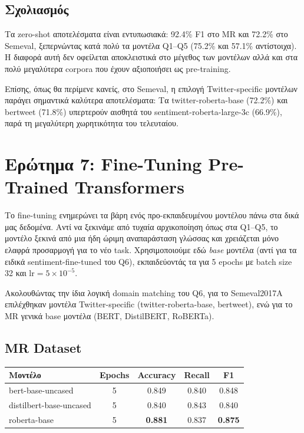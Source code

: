\documentclass[12pt]{article}
\begin{document}
\subsection{Σχολιασμός}

Τα zero-shot αποτελέσματα είναι εντυπωσιακά: 92.4\% F1 στο MR και
72.2\% στο Semeval, ξεπερνώντας κατά πολύ τα μοντέλα Q1--Q5 (75.2\%
και 57.1\% αντίστοιχα). Η διαφορά αυτή δεν οφείλεται αποκλειστικά στο
μέγεθος των μοντέλων αλλά και στα πολύ μεγαλύτερα corpora που έχουν αξιοποιήσει ως pre-training.

Επίσης, όπως θα περίμενε κανείς, στο Semeval, η επιλογή Twitter-specific μοντέλων παράγει σημαντικά καλύτερα αποτελέσματα:
Τα twitter-roberta-base (72.2\%) και bertweet (71.8\%) υπερτερούν αισθητά
του sentiment-roberta-large-3c (66.9\%), παρά τη μεγαλύτερη χωρητικότητα
του τελευταίου.

\section{Ερώτημα 7: Fine-Tuning Pre-Trained Transformers}

Το fine-tuning ενημερώνει τα βάρη ενός προ-εκπαιδευμένου μοντέλου
πάνω στα δικά μας δεδομένα. Αντί να ξεκινάμε από τυχαία αρχικοποίηση
όπως στα Q1--Q5, το μοντέλο ξεκινά από μια ήδη ώριμη αναπαράσταση
γλώσσας και χρειάζεται μόνο ελαφρά προσαρμογή για το νέο task.
Χρησιμοποιούμε εδώ \emph{base} μοντέλα (αντί για τα ειδικά
sentiment-fine-tuned του Q6), εκπαιδεύοντάς τα για 5 epochs
με batch size 32 και $\text{lr} = 5 \times 10^{-5}$.

Ακολουθώντας την ίδια λογική domain matching του Q6, για το
Semeval2017A επιλέχθηκαν μοντέλα Twitter-specific
(twitter-roberta-base, bertweet), ενώ για το MR
γενικά base μοντέλα (BERT, DistilBERT, RoBERTa).

\subsection{MR Dataset}

\begin{center}
\begin{tabular}{lcccc}
\toprule
Μοντέλο & Epochs & Accuracy & Recall & F1 \\
\midrule
bert-base-uncased & 5 & 0.849 & 0.840 & 0.848 \\
distilbert-base-uncased & 5 & 0.840 & 0.843 & 0.840 \\
roberta-base & 5 & \textbf{0.881} & 0.837 & \textbf{0.875} \\
\bottomrule
\end{tabular}
\end{center}
\end{document}
